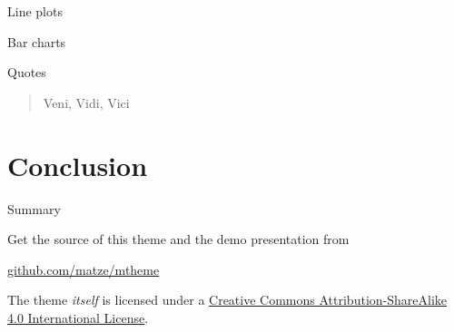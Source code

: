 \documentclass[10pt, compress]{beamer}
\begin{document}
\begin{frame}{Line plots}
  \begin{figure}
  \end{figure}
\end{frame}
\begin{frame}{Bar charts}
  \begin{figure}
  \end{figure}
\end{frame}
\begin{frame}{Quotes}
  \begin{quote}
    Veni, Vidi, Vici
  \end{quote}
\end{frame}


\section{Conclusion}

\begin{frame}{Summary}

  Get the source of this theme and the demo presentation from

  \begin{center}\url{github.com/matze/mtheme}\end{center}

  The theme \emph{itself} is licensed under a
  \href{http://creativecommons.org/licenses/by-sa/4.0/}{Creative Commons
  Attribution-ShareAlike 4.0 International License}.

  \begin{center}\ccbysa\end{center}

\end{frame}

\end{document}
